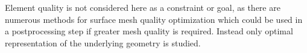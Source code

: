Element quality is not considered here as a constraint or goal, as there are
numerous methods for surface mesh quality optimization \cite{frey1998,
garimella2002, garimella2004a, garimella2004b, jiao2005, jiao2006, jiao2011,
jiao2013, lopez2008, montenegro2005, montenegro2006, montenegro2008,
montenegro2011, roca2012, roca2013, shivanna2010, zhang2009} which could be
used in a postprocessing step if greater mesh quality is required.  Instead
only optimal representation of the underlying geometry is studied.
